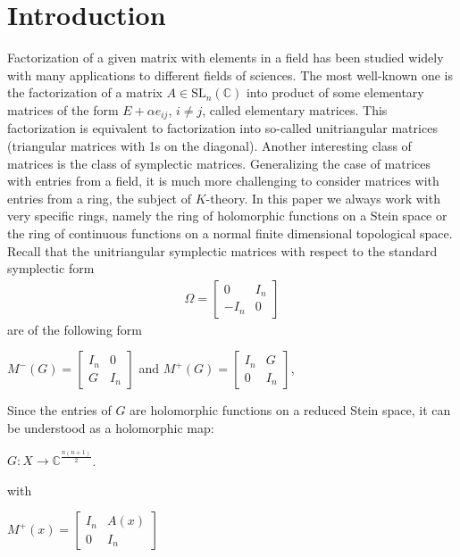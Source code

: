 \documentclass[10pt]{amsart}
\theoremstyle{remark}
\begin{document}
\section{Introduction}
Factorization of a given matrix with elements in a field  has been studied widely with many applications to different fields of sciences. The most well-known one is the factorization of a matrix $A \in \mathrm{SL}_n(\mathbb{C})$ into product of some elementary matrices of the form $E + \alpha e_{ij}$, $i \neq j$, called elementary matrices. This factorization is equivalent to factorization into so-called unitriangular matrices (triangular matrices with 1s on the diagonal). Another interesting class of matrices is the class of symplectic matrices.  
Generalizing the case of matrices with entries from a field, it is much more challenging to consider matrices with entries from a ring, the subject of $K$-theory. In this paper we always work
 with  very specific rings, namely the ring of holomorphic functions on a Stein space or the ring of continuous functions on a normal finite dimensional topological space. Recall that the  unitriangular symplectic matrices  with respect to the standard symplectic form
\begin{align*}
    \Omega = \left[\begin{array}{ccc}
        0 & I_n \\
        -I_n & 0
    \end{array}\right]
\end{align*}
are of the following form
\begin{center}
     $M^-(G) = \left[\begin{array}{ccc} I_n & 0 \\ G & I_n\end{array}\right]$ and $M^+(G)=\left[\begin{array}{ccc} I_n & G \\ 0 & I_n\end{array}\right]$,  
\end{center}
Since the entries of $G$ are holomorphic functions on a reduced Stein space, it can be understood as a holomorphic map:
\begin{center}
    $G: X \to \mathbb{C}^{\frac{n(n+1)}{2}}$.
\end{center}
\iffalse
with 
\begin{center}
    $M^{+}(x) =  \left[\begin{array}{ccc} I_n & A(x) \\ 0 & I_n\end{array}\right]$
\end{center}
\end{document}
